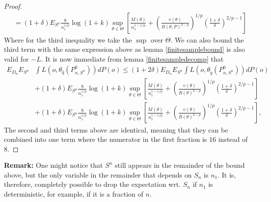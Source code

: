\documentclass[11pt, a4paper]{article}
\theoremstyle{definition}
\theoremstyle{remark}
\newcommand{\q}{q}
\newcommand{\btheta}{\theta}
\newcommand{\Sn}{S^n}
\begin{document}
\begin{proof}[Proof]
\begin{align*}
&= (1 + \delta) E_{\Sn}\frac{8}{n_1^{1/p}} \log(1 + k) \sup_{\btheta \in \Theta} \left[ \frac{M(\btheta)}{n_1^{1-1/p}} + \left( \frac{v(\btheta)}{R(\btheta,P)^{2-p}} \right)^{1/p}\left( \frac{1 + \delta}{\delta}  \right)^{2/p-1} \right]  
\end{align*}
Where for the third inequality we take the $ \sup $ over $ \Theta $. We can also bound the third term with the same expression above as lemma \ref{finitesamplebound} is also valid for $ -L $. It is now immediate from lemma \ref{finitesampledecomp} that 
\begin{align*}
    E_{D_n} E_{\Sn} &\int L(o, \btheta_{ \hat{\q} }(P_{n, \Sn}^{0})) d P(o) \leq (1 + 2 \delta) E_{D_n} E_{\Sn} \int L(o, \btheta_{ \tilde{\q} }(P_{n, \Sn}^{0})) d P(o) \\
                    &+ (1 + \delta) E_{\Sn}\frac{8}{n_1^{1/p}} \log(1 + k) \sup_{\btheta \in \Theta} \left[ \frac{M(\btheta)}{n_1^{1-1/p}} + \left( \frac{v(\btheta)}{R(\btheta)^{2-p}} \right)^{1/p}\left( \frac{1 + \delta}{\delta}  \right)^{2/p-1} \right]\\
                    &+ (1 + \delta) E_{\Sn}\frac{8}{n_1^{1/p}} \log(1 + k) \sup_{\btheta \in \Theta} \left[ \frac{M(\btheta)}{n_1^{1-1/p}} + \left( \frac{v(\btheta)}{R(\btheta)^{2-p}} \right)^{1/p}\left( \frac{1 + \delta}{\delta}  \right)^{2/p-1} \right],
\end{align*}
The second and third terms above are identical, meaning that they can be combined into one term where the numerator in the first fraction is $ 16 $ instead of $ 8 $. 
\end{proof}

\textbf{Remark:} One might notice that $ \Sn $ still appears in the remainder of the bound above, but the only variable in the remainder that depends on $ S_n $ is $ n_1 $. It is, therefore, completely possible to drop the expectation wrt. $ S_n $ if $ n_1 $ is deterministic, for example, if it is a fraction of $ n $.  
\end{document}
